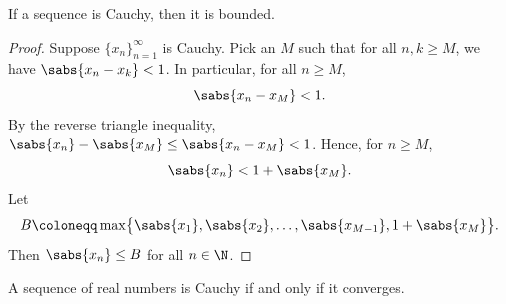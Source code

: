 %

\begin{prop}
If a sequence is Cauchy, then it is bounded.
\end{prop}

\begin{proof}
Suppose $\{ x_n \}_{n=1}^\infty$ is Cauchy.  Pick an $M$ such that for all
$n,k \geq M$, we have $\sabs{x_n-x_k} < 1$.  In particular, 
for all $n \geq M$,
\begin{equation*}
\sabs{x_n - x_M} < 1 .
\end{equation*}
By the reverse triangle inequality,
$\sabs{x_n} - \sabs{x_M} \leq \sabs{x_n - x_M} < 1$.  Hence, for $n \geq M$,
\begin{equation*}
\sabs{x_n} < 1 + \sabs{x_M}.
\end{equation*}
Let
\begin{equation*}
B \coloneqq \max \bigl\{ \sabs{x_1}, \sabs{x_2}, \ldots,
\sabs{x_{M-1}}, 1+ \sabs{x_M} \bigr\} .
\end{equation*}
Then $\sabs{x_n} \leq B$ for all $n \in \N$.
\end{proof}

\begin{thm}
A sequence of real numbers is Cauchy if and only if it converges.
\end{thm}

